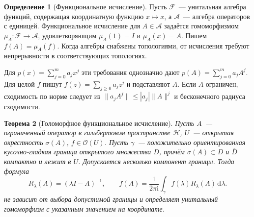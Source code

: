 \documentclass[11pt,a4paper]{article}
\theoremstyle{plain}
\newtheorem{theorem}{Теорема}[section]
\theoremstyle{definition}
\newtheorem{definition}[theorem]{Определение}
\newcommand{\Hh}{\mathcal H}
\newcommand{\id}{I}
\newcommand{\dd}{\,\mathrm d}
\newcommand{\ii}{\mathrm i}
\newcommand{\norm}[1]{\lVert#1\rVert}
\begin{document}
\begin{definition}[Функциональное исчисление]
Пусть $\mathcal F$~--- унитальная алгебра функций, содержащая
координатную функцию $x\mapsto x$, а $\mathcal A$~---
алгебра операторов с единицей. Функциональное исчисление для
$A\in\mathcal A$ задаётся гомоморфизмом
$\mu_A:\mathcal F\to\mathcal A$, удовлетворяющим
$\mu_A(1)=\id$ и $\mu_A(x)=A$. Пишем $f(A)=\mu_A(f)$.
Когда алгебры снабжены топологиями, от исчисления требуют
непрерывности в соответствующих топологиях.
\end{definition}
Для $p(x)=\sum_{j=0}^{m}a_jx^j$ эти требования однозначно
дают $p(A)=\sum_{j=0}^{m}a_jA^j$. Для целой $f$
пишут $f(z)=\sum_{j\ge0}a_jz^j$ и подставляют $A$.
Если $A$ ограничен, сходимость по норме следует из
$\norm{a_jA^j}\le |a_j|\norm A^j$ и бесконечного радиуса
сходимости.

\begin{theorem}[Голоморфное функциональное исчисление]
\label{thm:holomorphic-functional-calculus}
Пусть $A$~--- ограниченный оператор в гильбертовом
пространстве $\Hh$, $U$~--- открытая окрестность
$\sigma(A)$, $f\in\mathcal O(U)$. Пусть $\gamma$~---
положительно ориентированная кусочно-гладкая граница
открытого множества $D$, причём
$\sigma(A)\subset D$ и $\overline D$ компактно и лежит
в $U$. Допускается несколько компонент границы.
Тогда формула
\[
 R_\lambda(A)=(\lambda\id-A)^{-1},\qquad
 f(A)=\frac{1}{2\pi\ii}\int_\gamma f(\lambda)R_\lambda(A)\dd\lambda .
\]
не зависит от выбора допустимой границы и определяет
унитальный гомоморфизм с указанным значением на координате.
\end{theorem}
\end{document}

